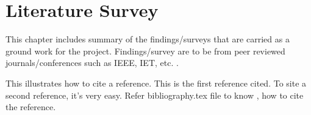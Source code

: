 \chapter{Literature Survey}

This chapter includes summary of the findings/surveys that are carried as a ground work for the project. Findings/survey are to be from peer reviewed journals/conferences such as IEEE, IET, etc. .

This illustrates how to cite a reference. This is the first \cite{bib:paper} reference cited. To site a second \cite{bib:raju} reference, it's very easy. Refer bibliography.tex file to know , how to cite the reference. 
